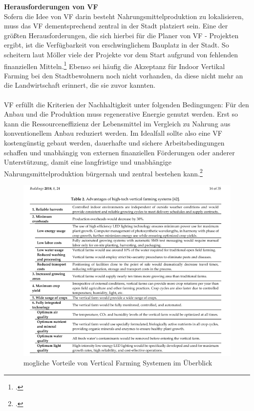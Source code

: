 \documentclass{scrartcl}
\begin{document}
\textbf{Herausforderungen von VF}\\
Sofern die Idee von VF darin besteht Nahrungsmittelproduktion zu lokalisieren, muss das VF dementsprechend zentral in der Stadt platziert sein. Eine der größten Herausforderungen, die sich hierbei für die Planer von VF - Projekten ergibt, ist die Verfügbarkeit von erschwinglichem Bauplatz in der Stadt. So scheitern laut Möller viele der Projekte vor dem Start aufgrund von fehlenden finanziellen Mitteln.\footcite[S.8]{PeterMollerVoss2013VerticalRise} Ebenso sei häufig die Akzeptanz für Indoor Vertikal Farming bei den Stadtbewohnern noch nicht vorhanden, da diese nicht mehr an die Landwirtschaft erinnert, die sie zuvor kannten.\\
\\

VF erfüllt die Kriterien der Nachhaltigkeit unter folgenden Bedingungen:
Für den Anbau und die Produktion muss regenerative Energie genutzt werden. Erst so kann die Ressourceneffizienz der Lebensmittel im Vergleich zu Nahrung aus konventionellem Anbau reduziert werden. 
Im Idealfall sollte also eine VF kostengünstig gebaut werden, dauerhafte und sichere Arbeitsbedingungen schaffen und unabhängig von externen finanziellen Förderungen oder anderer Unterstützung, damit eine langfristige und unabhängige Nahrungsmittelproduktion bürgernah und zentral bestehen kann.\footcite{Despommier2010TheCentury.}


\begin{figure}[htbp]
\centering
\includegraphics[width=14cm]{image_folder/moglicheVorteileVonVF.png}
\caption{mogliche Vorteile von Vertical Farming Systemen im Überblick}
\label{fig:vorteileVF}
\end{figure}
\end{document}
